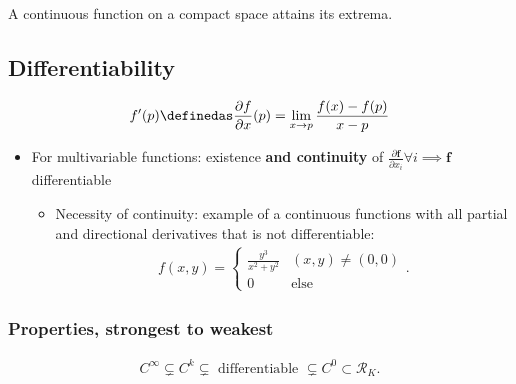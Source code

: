 \begin{theorem}

A continuous function on a compact space attains its extrema.

\end{theorem}

\hypertarget{differentiability}{%
\subsection{Differentiability}\label{differentiability}}

\begin{align*}
f'(p) \definedas \frac{\partial f}{\partial x}(p) = \lim_{x\to p} \frac{f(x) - f(p)}{x-p}
\end{align*}

\begin{itemize}
\tightlist
\item
  For multivariable functions: existence \textbf{and continuity} of
  \(\frac{\partial \mathbf{f}}{\partial x_i} \forall i \implies \mathbf{f}\)
  differentiable

  \begin{itemize}
  \tightlist
  \item
    Necessity of continuity: example of a continuous functions with all
    partial and directional derivatives that is not differentiable:
    \begin{align*}  
    f(x, y) = 
    \begin{cases}
    \frac{y^3}{x^2+y^2} & (x,y) \neq (0,0) \\ 
    0 & \text{else}
    \end{cases}
    .\end{align*}
  \end{itemize}
\end{itemize}

\hypertarget{properties-strongest-to-weakest}{%
\subsubsection{Properties, strongest to
weakest}\label{properties-strongest-to-weakest}}

\begin{align*}  
C^\infty \subsetneq C^k \subsetneq \text{ differentiable } \subsetneq C^0 \subset \mathcal{R}_K
.\end{align*}

